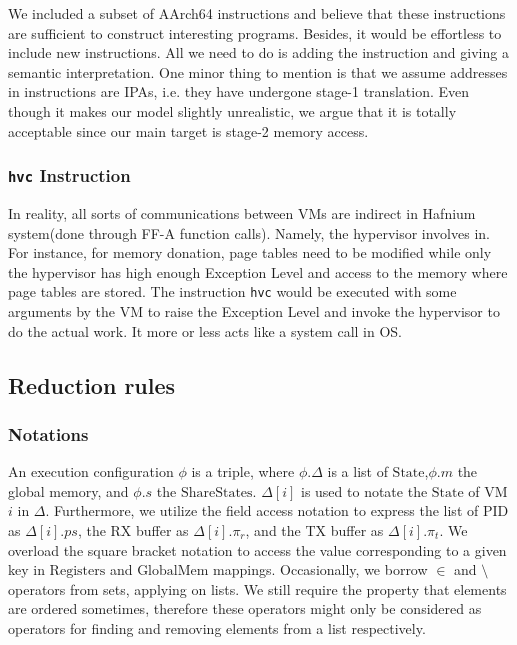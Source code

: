 \documentclass[a4paper]{article}
\newcommand*{\STATE}{\text{State}}
\newcommand*{\MEM}{\text{GlobalMem}}
\newcommand*{\SSS}{\text{ShareStates}}
\newcommand*{\PID}{\text{PID}}
\newcommand*{\REGS}{\text{Registers}}
\newcommand*{\instr}[1]{\texttt{#1}}
\begin{document}
We included a subset of AArch64 instructions and believe that these instructions
are sufficient to construct interesting programs. Besides, it would be
effortless to include new instructions. All we need to do is adding the
instruction and giving a semantic interpretation. One minor thing to mention is
that we assume addresses in instructions are IPAs, i.e. they have undergone
stage-1 translation. Even though it makes our model slightly unrealistic, we argue
that it is totally acceptable since our main target is stage-2 memory access.

\subsubsection{\instr{hvc} Instruction}
In reality, all sorts of communications
between VMs are indirect in Hafnium system(done through FF-A function calls).
Namely, the hypervisor involves in. For instance, for memory donation, page
tables need to be modified while only the hypervisor has high enough Exception
Level and access to the memory where page tables are stored. The instruction
\texttt{hvc} would be executed with some arguments by the VM to raise the
Exception Level and invoke the hypervisor to do the actual work. It more or less
acts like a system call in OS.




\subsection{Reduction rules}
\subsubsection{Notations}
An execution configuration $\phi$ is a triple, where $\phi.\Delta$
is a list of $\STATE$,$\phi.m$ the global memory, and $\phi.s$ the $\SSS$. $\Delta[i]$ is used
to notate the $\STATE$ of VM $i$ in $\Delta$. Furthermore, we utilize the field
access notation to express the list of $\PID$ as $\Delta[i].ps$, the RX buffer as $\Delta[i].\pi_{r}$,
and the TX buffer as $\Delta[i].\pi_{t}$.
We overload the square bracket notation to access
the value corresponding to a given key in $\REGS$ and $\MEM$ mappings. Occasionally, we
borrow $\in$ and $\setminus$ operators from sets, applying on lists. We still require
the property that elements are ordered sometimes, therefore these
operators might only be considered as operators for finding
and removing elements from a list respectively.
\end{document}
